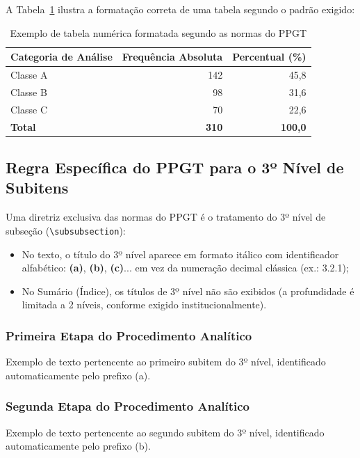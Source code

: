 A Tabela~\ref{tab:exemplo_tabela} ilustra a formatação correta de uma tabela segundo o padrão exigido:

\begin{table}[htbp]
  \centering
  \caption{Exemplo de tabela numérica formatada segundo as normas do PPGT}
  \label{tab:exemplo_tabela}
  \small
  \begin{tabular}{lrr}
    \hline
    \textbf{Categoria de Análise} & \textbf{Frequência Absoluta} & \textbf{Percentual (\%)} \\
    \hline
    Classe A & 142 & 45,8 \\
    Classe B & 98 & 31,6 \\
    Classe C & 70 & 22,6 \\
    \hline
    \textbf{Total} & \textbf{310} & \textbf{100,0} \\
    \hline
  \end{tabular}
\end{table}

\subsection{Regra Específica do PPGT para o 3º Nível de Subitens}
\label{subsec:terceiro_nivel}

Uma diretriz exclusiva das normas do PPGT é o tratamento do 3º nível de subseção (\texttt{\textbackslash subsubsection}):
\begin{itemize}
  \item No texto, o título do 3º nível aparece em formato itálico com identificador alfabético: \textbf{(a)}, \textbf{(b)}, \textbf{(c)}... em vez da numeração decimal clássica (ex.: 3.2.1);
  \item No Sumário (Índice), os títulos de 3º nível não são exibidos (a profundidade é limitada a 2 níveis, conforme exigido institucionalmente).
\end{itemize}

\subsubsection{Primeira Etapa do Procedimento Analítico}

Exemplo de texto pertencente ao primeiro subitem do 3º nível, identificado automaticamente pelo prefixo (a).

\subsubsection{Segunda Etapa do Procedimento Analítico}

Exemplo de texto pertencente ao segundo subitem do 3º nível, identificado automaticamente pelo prefixo (b).

